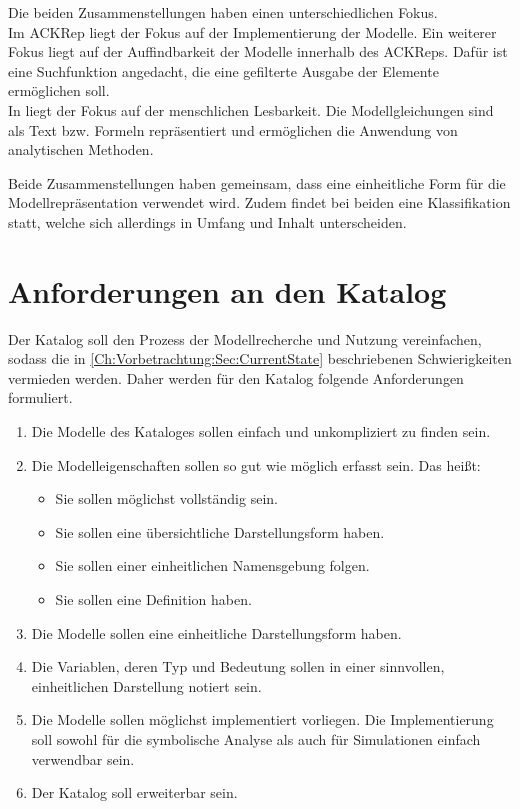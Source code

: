 Die beiden Zusammenstellungen haben einen unterschiedlichen Fokus.\\
Im ACKRep liegt der Fokus auf der Implementierung der Modelle. Ein weiterer Fokus liegt auf der Auffindbarkeit der Modelle innerhalb des ACKReps. Dafür ist eine Suchfunktion angedacht, die eine gefilterte Ausgabe der Elemente ermöglichen soll.\\
In \cite{LIYU13} liegt der Fokus auf der menschlichen Lesbarkeit. Die Modellgleichungen sind als Text bzw. Formeln repräsentiert und ermöglichen die Anwendung von analytischen Methoden. 

Beide Zusammenstellungen haben gemeinsam, dass eine einheitliche Form für die Modellrepräsentation verwendet wird. Zudem findet bei beiden eine Klassifikation statt, welche sich allerdings in Umfang und Inhalt unterscheiden.

\section{Anforderungen an den Katalog} 
\label{Ch:Vorbetrachtung:Sec:Anforderungen}

Der Katalog soll den Prozess der Modellrecherche und Nutzung vereinfachen, sodass die in \autoref{Ch:Vorbetrachtung:Sec:CurrentState} beschriebenen Schwierigkeiten vermieden werden. Daher werden für den Katalog folgende Anforderungen formuliert.
\begin{enumerate}[label=\textbf{Anforderung A.\arabic*}:, ref=\textbf{A.\arabic*}, wide=0pt, leftmargin=*]
	\item \label{A.Findbarkeit}Die Modelle des Kataloges sollen einfach und unkompliziert zu finden sein.
	\item \label{A.Modelleigenschaften}Die Modelleigenschaften sollen so gut wie möglich erfasst sein. Das heißt:
	\begin{itemize}[label=$\bullet$]
		\item Sie sollen möglichst vollständig sein.
		\item Sie sollen eine übersichtliche Darstellungsform haben.
		\item Sie sollen einer einheitlichen Namensgebung folgen.
		\item Sie sollen eine Definition haben.
	\end{itemize}
	\item \label{A.Darstellung_Gleichungen}Die Modelle sollen eine einheitliche Darstellungsform haben.
	\item \label{A.Darstellung_Variablen}Die Variablen, deren Typ und Bedeutung sollen in einer sinnvollen, einheitlichen Darstellung notiert sein.
	\item \label{A.Implementierung}Die Modelle sollen möglichst implementiert vorliegen. Die Implementierung soll sowohl für die symbolische Analyse als auch für Simulationen einfach verwendbar sein.
	\item \label{A.Erweiterbarkeit}Der Katalog soll erweiterbar sein. %
\end{enumerate}

